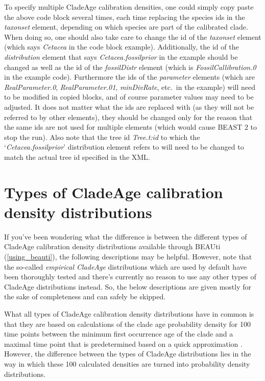\documentclass{article}
\begin{document}
To specify multiple CladeAge calibration densities, one could simply copy paste the above code block several times, each time replacing the species ids in the \emph{taxonset} element, depending on which species are part of the calibrated clade. When doing so, one should also take care to change the id of the \emph{taxonset} element (which says \emph{Cetacea} in the code block example). Additionally, the id of the \emph{distribution} element that says \emph{Cetacea.fossilprior} in the example should be changed as well as the id of the \emph{fossilDistr} element (which is \emph{FossilCallibration.0} in the example code). Furthermore the ids of the \emph{parameter} elements (which are \emph{RealParameter.0}, \emph{RealParameter.01}, \emph{minDivRate}, etc.\ in the example) will need to be modified in copied blocks, and of course parameter values may need to be adjusted. It does not matter what the ids are replaced with (as they will not be referred to by other elements), they should be changed only for the reason that the same ids are not used for multiple elements (which would cause BEAST 2 to stop the run). Also note that the tree id \emph{Tree.t:id} to which the `\emph{Cetacea.fossilprior}' distribution element refers to will need to be changed to match the actual tree id specified in the XML.

\section{Types of CladeAge calibration density distributions}\label{calibration_types}

If you've been wondering what the difference is between the different types of CladeAge calibration density distributions available through BEAUti (\ref{using_beauti}), the following descriptions may be helpful. However, note that the so-called \emph{empirical CladeAge} distributions which are used by default have been thoroughly tested and there's currently no reason to use any other types of CladeAge distributions instead. So, the below descriptions are given mostly for the sake of completeness and can safely be skipped.

What all types of CladeAge calibration density distributions have in common is that they are based on calculations of the clade age probability density for 100 time points between the minimum first occurrence age of the clade and a maximal time point that is predetermined based on a quick approximation \citep[details given in][]{Matschiner:2016ga}. However, the difference between the types of CladeAge distributions lies in the way in which these 100 calculated densities are turned into probability density distributions.
\end{document}
